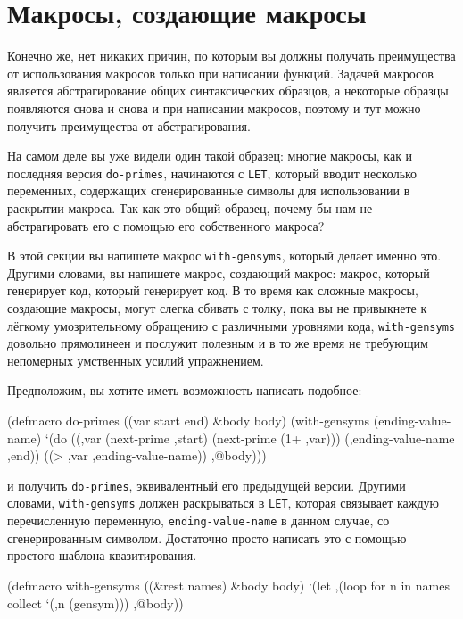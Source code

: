 \section{Макросы, создающие макросы}

Конечно же, нет никаких причин, по которым вы должны получать преимущества от
использования макросов только при написании функций. Задачей макросов является
абстрагирование общих синтаксических образцов, а некоторые образцы появляются снова и
снова и при написании макросов, поэтому и тут можно получить преимущества от
абстрагирования.

На самом деле вы уже видели один такой образец: многие макросы, как и последняя версия
\lstinline{do-primes}, начинаются с \lstinline{LET}, который вводит несколько переменных,
содержащих сгенерированные символы для использовании в раскрытии макроса. Так как это
общий образец, почему бы нам не абстрагировать его с помощью его собственного макроса?

В этой секции вы напишете макрос \lstinline{with-gensyms}, который делает именно это. Другими
словами, вы напишете макрос, создающий макрос: макрос, который генерирует код, который
генерирует код. В то время как сложные макросы, создающие макросы, могут слегка сбивать с
толку, пока вы не привыкнете к лёгкому умозрительному обращению с различными уровнями
кода, \lstinline{with-gensyms} довольно прямолинеен и послужит полезным и в то же время не
требующим непомерных умственных усилий упражнением.

Предположим, вы хотите иметь возможность написать подобное:

\begin{myverb}
(defmacro do-primes ((var start end) &body body)
  (with-gensyms (ending-value-name)
    `(do ((,var (next-prime ,start) (next-prime (1+ ,var)))
          (,ending-value-name ,end))
         ((> ,var ,ending-value-name))
       ,@body)))
\end{myverb}

\noindent{}и получить \lstinline{do-primes}, эквивалентный его предыдущей версии. Другими словами,
\lstinline{with-gensyms} должен раскрываться в \lstinline{LET}, которая связывает каждую
перечисленную переменную, \lstinline{ending-value-name} в данном случае, со сгенерированным
символом. Достаточно просто написать это с помощью простого шаблона-квазитирования.

\begin{myverb}
(defmacro with-gensyms ((&rest names) &body body)
  `(let ,(loop for n in names collect `(,n (gensym)))
     ,@body))
\end{myverb}

